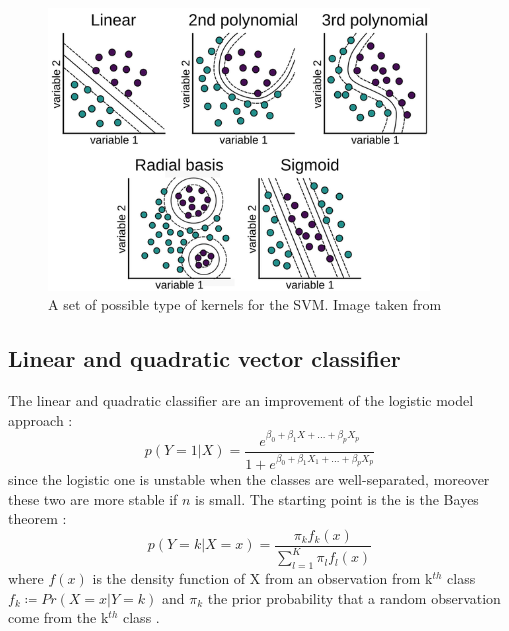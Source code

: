 \documentclass[
12pt, %
a4paper, %
oneside, %
headinclude,footinclude, %
BCOR5mm, %
]{scrartcl}
\begin{document}
\begin{figure}[h]
\begin{center}
\includegraphics[width=0.9\textwidth]{Pic/Kernels_Type.png}
\caption{A set of possible type of kernels for the SVM. Image taken from \cite{ker_svm}}
\label{SVM_kernels}
\end{center}
\end{figure}
\subsection{Linear and quadratic vector classifier}
The linear and quadratic classifier are an improvement of the logistic model approach \cite{james2013introduction}: 
\begin{equation}
p(Y=1|X)=\dfrac{e^{\beta_{0}+\beta_{1}X+...+\beta_{p}X_{p}}}{1+e^{\beta_{0}+\beta_{1}X_{1}+...+\beta_{p}X_{p}}}
\end{equation}
since the logistic one is unstable when the classes are well-separated, moreover these two are more stable if $n$ is small. The starting point is the is the Bayes theorem \cite{james2013introduction}:
\begin{equation}
p(Y=k|X=x)=\dfrac{\pi_{k}f_{k}(x)}{\sum_{l=1}^{K}\pi_{l}f_{l}(x)}
\end{equation}
where $f(x)$ is the density function of X from an observation from k$^{th}$ class  $f_{k}\coloneqq Pr(X=x|Y=k)$ and $\pi_{k}$ the prior probability that a random observation come from the k$^{th}$ class \cite{james2013introduction}. 
\end{document}
